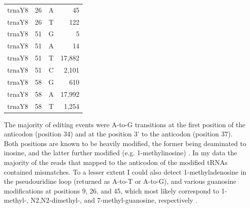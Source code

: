 \documentclass[12pt]{rockefeller}
\begin{document}
{\begin{center}
\begin{supertabular}{|l|r|c|r|}
  trnaY8 &        26 &          A &         45 \\
  trnaY8 &        26 &          T &        122 \\
  trnaY8 &        51 &          G &          5 \\
  trnaY8 &        51 &          A &         14 \\
  trnaY8 &        51 &          T &     17,882 \\
  trnaY8 &        51 &          C &      2,101 \\
  trnaY8 &        58 &          G &        610 \\
  trnaY8 &        58 &          A &     17,992 \\
  trnaY8 &        58 &          T &      1,254 \\
\hline
\end{supertabular}
\end{center}
\pagebreak
}
\onecolumn

The majority of editing events were A-to-G transitions at the first position of the anticodon (position 34) and at the position 3’ to the anticodon (position 37). Both positions are known to be heavily modified, the former being deaminated to inosine, and the latter further modified (e.g. 1-methylinosine) \cite{Machnicka:2013ky}. In my data the majority of the reads that mapped to the anticodon of the modified tRNAs contained mismatches. To a lesser extent I could also detect 1-methyladenosine in the pseudouridine loop (returned as A-to-T or A-to-G), and various guanosine modifications at positions 9, 26, and 45, which most likely correspond to 1-methyl-, N2,N2-dimethyl-, and 7-methyl-guanosine, respectively \cite{Machnicka:2013ky}.
\end{document}
